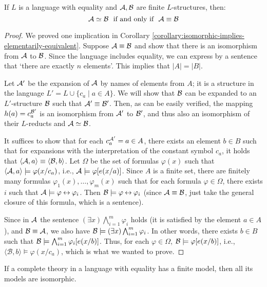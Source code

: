 \begin{proposition}
    If $L$ is a language with equality and $\mathcal{A}, \mathcal{B}$ are finite $L$-structures, then:
    $$
    \mathcal{A} \simeq \mathcal{B}\ \text{ if and only if }\ \mathcal{A} \equiv \mathcal{B}
    $$
\end{proposition}
\begin{proof}
    We proved one implication in Corollary \ref{corollary:isomorphic-implies-elementarily-equivalent}. Suppose $\mathcal{A} \equiv \mathcal{B}$ and show that there is an isomorphism from $\mathcal{A}$ to $\mathcal{B}$. Since the language includes equality, we can express by a sentence that `there are exactly $n$ elements'. This implies that $|A| = |B|$.

    Let $\mathcal{A}'$ be the expansion of $\mathcal{A}$ by names of elements from $A$; it is a structure in the language $L' = L \cup \{c_a \mid a \in A\}$. We will show that $\mathcal{B}$ can be expanded to an $L'$-structure $\mathcal{B}$ such that $\mathcal{A}' \equiv \mathcal{B}'$. Then, as can be easily verified, the mapping $h(a) = c_a^{\mathcal{B}'}$ is an isomorphism from $\mathcal{A}'$ to $\mathcal{B}'$, and thus also an isomorphism of their $L$-reducts and $\mathcal{A} \simeq \mathcal{B}$.

    It suffices to show that for each $c_a^{\mathcal{A}'} = a \in A$, there exists an element $b \in B$ such that for expansions with the interpretation of the constant symbol $c_a$, it holds that $\langle \mathcal{A}, a \rangle \equiv \langle \mathcal{B}, b \rangle$. Let $\Omega$ be the set of formulas $\varphi(x)$ such that $\langle \mathcal{A}, a \rangle \models \varphi(x/c_a)$, i.e., $\mathcal{A} \models \varphi[e(x/a)]$. Since $A$ is a finite set, there are finitely many formulas $\varphi_1(x), \dots, \varphi_m(x)$ such that for each formula $\varphi \in \Omega$, there exists $i$ such that $\mathcal{A} \models \varphi \mathbin{\leftrightarrow} \varphi_i$. Then $\mathcal{B} \models \varphi \mathbin{\leftrightarrow} \varphi_i$ (since $\mathcal{A} \equiv \mathcal{B}$, just take the general closure of this formula, which is a sentence).
    
    Since in $\mathcal{A}$ the sentence $(\exists x)\bigwedge_{i=1}^m \varphi_i$ holds (it is satisfied by the element $a \in A$), and $\mathcal{B} \equiv \mathcal{A}$, we also have $\mathcal{B} \models (\exists x)\bigwedge_{i=1}^m \varphi_i$. In other words, there exists $b \in B$ such that $\mathcal{B} \models \bigwedge_{i=1}^m \varphi_i[e(x/b)]$. Thus, for each $\varphi \in \Omega$, $\mathcal{B} \models \varphi[e(x/b)]$, i.e., $\langle \mathcal{B}, b \rangle \models \varphi(x/c_a)$, which is what we wanted to prove.
\end{proof}

\begin{corollary}
    If a complete theory in a language with equality has a finite model, then all its models are isomorphic.
\end{corollary}

